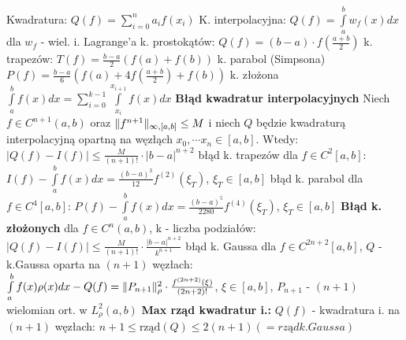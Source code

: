 
\entry
Kwadratura:
	\(
		Q(f) = \sum\limits_{i=0}^n a_if(x_i)
    \)
\entry
K. interpolacyjna:
    \(
        Q(f) = \int\limits_a^bw_f(x)dx
	\) dla $w_f$ - wiel. i. Lagrange'a
\entry
k. prostokątów:
	\(
		Q(f) = (b-a)\cdot f(\frac{a+b}{2})
	\)
\entry
k. trapezów:
	\(
		T(f) = \frac{b-a}{2}(f(a)+f(b))
	\)
\entry
k. parabol (Simpsona)
	\(
		P(f) = \frac{b-a}{6}(f(a) + 4f(\frac{a+b}{2})+f(b))
	\)
\entry
k. złożona
    \(
        \int\limits_a^b f(x)dx = \sum_{i=0}^{k-1} \int\limits_{x_i}^{x_{i+1}} f(x)dx
    \)
\entry
\textbf{Błąd kwadratur interpolacyjnych}
	Niech $f \in C^{n+1}(a, b)$ oraz $\|f^{n+1}\|_{\infty, [a, b]} \leq M$ i niech $Q$ będzie kwadraturą interpolacyjną opartną na węzłąch $x_0, \cdots x_n \in [a, b]$. Wtedy:
	\(
		|Q(f) - I(f)| \leq \frac{M}{(n+1)!} \cdot |b-a|^{n+2}
	\)
\entry
błąd k. trapezów dla $f \in C^2[a, b]$:
	\(
		I(f) - \int\limits_a^bf(x)dx = \frac{(b-a)^3}{12}f^{(2)}(\xi_T)
	\), $\xi_T \in [a, b]$
\entry
błąd k. parabol dla $f \in C^4[a, b]$:
	\(
		P(f) - \int\limits_a^bf(x)dx = \frac{(b-a)^5}{2280}f^{(4)}(\xi_T)
	\), $\xi_T \in [a, b]$
\entry
\textbf{Błąd k. złożonych} dla $f \in C^{n}(a, b)$, k - liczba podziałów:
    \(
        |Q(f) - I(f)| \leq \frac{M}{(n+1)!} \cdot \frac{|b-a|^{n+2}}{k^{n+1}}
    \)
\entry
błąd k. Gaussa dla $f \in  C^{2n+2}[a, b]$, $Q$ - k.Gaussa oparta na $(n+1)$ węzłach:
	\(
		\int\limits_a^b f(x)\rho(x)dx - Q(f) = \|P_{n+1}\|^2_\rho\cdot \frac{f^{(2n+2)}(\xi)}{(2n+2)!}
	\), $\xi \in [a, b]$, $P_{n+1}$ - $(n+1)$ wielomian ort. w $L^2_\rho(a, b)$
\entry
\textbf{Max rząd kwadratur i.:} $Q(f)$ - kwadratura i. na $(n+1)$ węzłach:
\(
	n+1 \leq \textrm{rząd}(Q) \leq 2(n+1) (=rząd k. Gaussa)
\)
